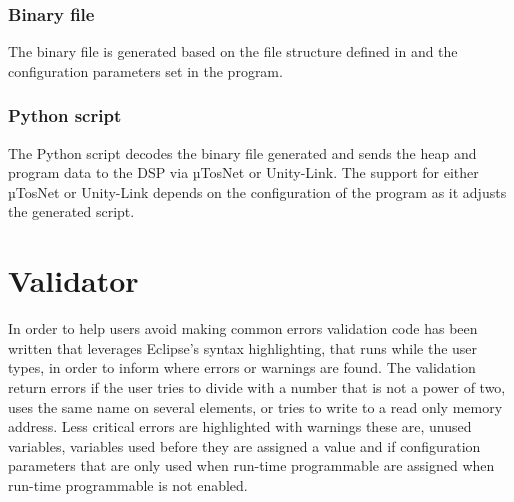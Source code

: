 \subsubsection{Binary file}
The binary file is generated based on the file structure defined in  and the configuration parameters set in the program.

\subsubsection{Python script}
The Python script decodes the binary file generated and sends the heap and program data to the DSP via µTosNet or Unity-Link. The support for either µTosNet or Unity-Link depends on the configuration of the program as it adjusts the generated script.

\section{Validator}
In order to help users avoid making common errors validation code has been written that leverages Eclipse's syntax highlighting, that runs while the user types, in order to inform where errors or warnings are found. The validation return errors if the user tries to divide with a number that is not a power of two, uses the same name on several elements, or tries to write to a read only memory address. Less critical errors are highlighted with warnings these are, unused variables, variables used before they are assigned a value and if configuration parameters that are only used when run-time programmable are assigned when run-time programmable is not enabled.